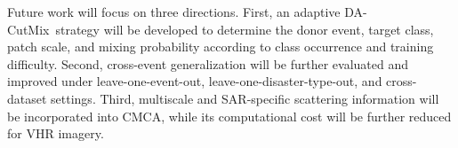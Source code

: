 \documentclass[journal]{IEEEtran}
\newcommand{\cmca}{CMCA}
\newcommand{\dacutmix}{DA-CutMix}
\begin{document}
    Future work will focus on three directions. First, an adaptive \dacutmix\ strategy will be developed to determine the donor event, target class, patch scale, and mixing probability according to class occurrence and training difficulty. Second, cross-event generalization will be further evaluated and improved under leave-one-event-out, leave-one-disaster-type-out, and cross-dataset settings. Third, multiscale and SAR-specific scattering information will be incorporated into \cmca, while its computational cost will be further reduced for VHR imagery.
    
    
    
    
    
\end{document}
